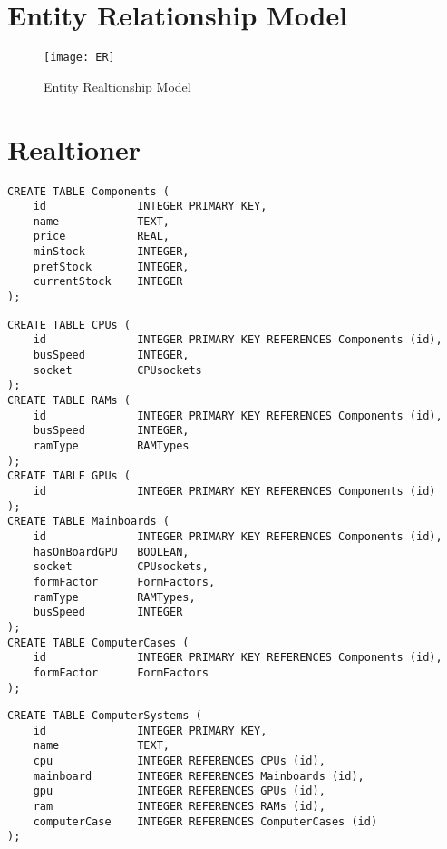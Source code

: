 \documentclass[a4paper]{article}
\begin{document}
\appendix

\section{Entity Relationship Model}
\label{appendix:er}

\begin{figure}[htbp!]
    \centering
    \texttt{[image: ER]}
    \caption{Entity Realtionship Model}
    \label{fig:er}
\end{figure}

\section{Realtioner}

\begin{lstlisting}[caption=\texttt{Components} Relation]
CREATE TABLE Components (
    id              INTEGER PRIMARY KEY,
    name            TEXT,
    price           REAL,
    minStock        INTEGER,
    prefStock       INTEGER,
    currentStock    INTEGER
);
\end{lstlisting}

\begin{lstlisting}[caption=Sub-relationer til \texttt{Components}]
CREATE TABLE CPUs (
    id              INTEGER PRIMARY KEY REFERENCES Components (id),
    busSpeed        INTEGER,
    socket          CPUsockets
);
CREATE TABLE RAMs (
    id              INTEGER PRIMARY KEY REFERENCES Components (id),
    busSpeed        INTEGER,
    ramType         RAMTypes
);
CREATE TABLE GPUs (
    id              INTEGER PRIMARY KEY REFERENCES Components (id)
);
CREATE TABLE Mainboards (
    id              INTEGER PRIMARY KEY REFERENCES Components (id),
    hasOnBoardGPU   BOOLEAN,
    socket          CPUsockets,
    formFactor      FormFactors,
    ramType         RAMTypes,
    busSpeed        INTEGER
);
CREATE TABLE ComputerCases (
    id              INTEGER PRIMARY KEY REFERENCES Components (id),
    formFactor      FormFactors
);
\end{lstlisting}

\begin{lstlisting}[caption=\texttt{ComputerSystem} Relation]
CREATE TABLE ComputerSystems (
    id              INTEGER PRIMARY KEY,
    name            TEXT,
    cpu             INTEGER REFERENCES CPUs (id),
    mainboard       INTEGER REFERENCES Mainboards (id),
    gpu             INTEGER REFERENCES GPUs (id),
    ram             INTEGER REFERENCES RAMs (id),
    computerCase    INTEGER REFERENCES ComputerCases (id)
);
\end{lstlisting}
\end{document}

